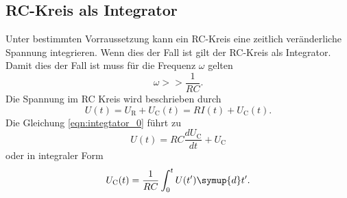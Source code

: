 \subsection{RC-Kreis als Integrator}
Unter bestimmten Vorraussetzung kann ein RC-Kreis eine zeitlich veränderliche Spannung integrieren.
Wenn dies der Fall ist gilt der RC-Kreis als Integrator.
Damit dies der Fall ist muss für die Frequenz $\omega$ gelten
\begin{equation*}
    \omega >> \frac{1}{RC}.
\end{equation*} 
Die Spannung im RC Kreis wird beschrieben durch
\begin{equation}
    U(t) = U_\text{R}+U_\text{C}(t) = R I(t) + U_\text{C}(t).
    \label{eqn:integtator_0}
\end{equation}
Die Gleichung \eqref{eqn:integtator_0} führt zu
\begin{equation*}
    U(t) = RC \frac{dU_\text{C}}{dt}+U_\text{C}
\end{equation*}
oder in integraler Form 
\begin{equation}
    U_\text{C}(t) = \frac{1}{RC} \int_0^t  U(t') \symup{d}t'.
    \label{eqn:integator}
\end{equation}